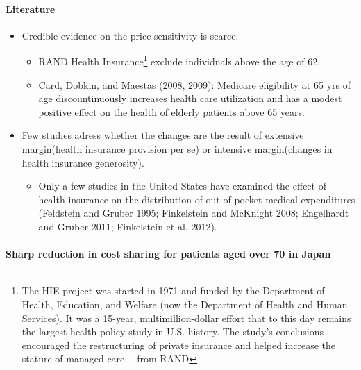 \documentclass[../root]{subfiles}
\begin{document}
    \paragraph{Literature}

    \begin{itemize}
      \item Credible evidence on the price sensitivity is scarce.
      \begin{itemize}
        \item RAND Health Insurance\footnote{The HIE project was started in 1971 and funded by the Department of Health, Education, and Welfare (now the Department of Health and Human Services). It was a 15-year, multimillion-dollar effort that to this day remains the largest health policy study in U.S. history. The study's conclusions encouraged the restructuring of private insurance and helped increase the stature of managed care. - from RAND} exclude individuals above the age of 62.
        \item Card, Dobkin, and Maestas (2008, 2009): Medicare eligibility at 65 yrs of age discountinuously increases health care utilization and has a modest positive effect on the health of elderly patients above 65 years.
      \end{itemize}
      \item Few studies adress whether the changes are the result of extensive margin(health insurance provision per se) or intensive margin(changes in health insurance generosity).
      \begin{itemize}
        \item Only a few studies in the United States have examined the effect of health insurance on the distribution of out-of-pocket medical expenditures (Feldstein and Gruber 1995; Finkelstein and McKnight 2008; Engelhardt and Gruber 2011; Finkelstein et al. 2012).
      \end{itemize}
    \end{itemize}

    \paragraph{Sharp reduction in cost sharing for patients aged over 70 in Japan}
\end{document}
